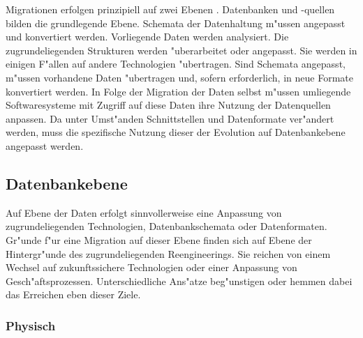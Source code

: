 Migrationen erfolgen prinzipiell auf zwei Ebenen \citep{henrard-2002}. Datenbanken und -quellen bilden die grundlegende Ebene. Schemata der Datenhaltung m"ussen angepasst und konvertiert werden. Vorliegende Daten werden analysiert. Die zugrundeliegenden Strukturen werden "uberarbeitet oder angepasst. Sie werden in einigen F"allen auf andere Technologien "ubertragen. Sind Schemata angepasst, m"ussen vorhandene Daten "ubertragen und, sofern erforderlich, in neue Formate konvertiert werden.
\lb
In Folge der Migration der Daten selbst m"ussen umliegende Softwaresysteme mit Zugriff auf diese Daten ihre Nutzung der Datenquellen anpassen. Da unter Umst"anden Schnittstellen und Datenformate ver"andert werden, muss die spezifische Nutzung dieser der Evolution auf Datenbankebene angepasst werden. 

\subsection{Datenbankebene}

Auf Ebene der Daten erfolgt sinnvollerweise eine Anpassung von zugrundeliegenden Technologien, Datenbankschemata oder Datenformaten. Gr"unde f"ur eine Migration auf dieser Ebene finden sich auf Ebene der Hintergr"unde des zugrundeliegenden Reengineerings. Sie reichen von einem Wechsel auf zukunftssichere Technologien oder einer Anpassung von Gesch"aftsprozessen. Unterschiedliche Ans"atze beg"unstigen oder hemmen dabei das Erreichen eben dieser Ziele. 

\subsubsection{Physisch}

